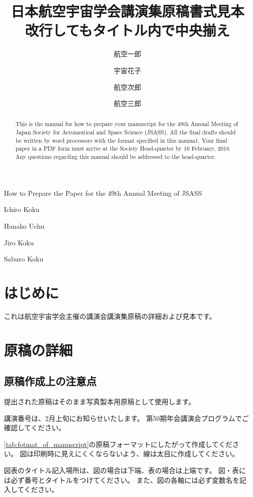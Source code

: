 \documentclass{jsass-nenkai}
\begin{document}
\title{日本航空宇宙学会講演集原稿書式見本\\改行してもタイトル内で中央揃え}{How to Prepare the Paper for the 49th Annual Meeting of JSASS}

\author[1]{航空一郎}{Ichiro Koku}
\author[1]{宇宙花子}{Hanako Uchu}
\author[2]{航空次郎}{Jiro Koku}
\author[1]{航空三郎}{Saburo Koku}



\begin{abstract}
  This is the manual for how to prepare your manuscript for the 49th Annual Meeting of Japan Society for Aeronautical and Space Science (JSASS).
  All the final drafts should be written by word processors with the format specified in this manua1.
  Your final paper in a PDF form must arrive at the Society Head-quarter by 16 February, 2018.
  Any questions regarding this manual should be addressed to the head-quarter.
\end{abstract}

\maketitle


\section{はじめに}
  これは航空宇宙学会主催の講演会講演集原稿の詳細および見本です。

\section{原稿の詳細}
  \subsection{原稿作成上の注意点}
    提出された原稿はそのまま写真製本用原稿として使用します。

    講演番号は、2月上旬にお知らせいたします。
    第50期年会講演会プログラムでご確認してください。

    \cref{tab:fotmat_of_manuscript}の原稿フォーマットにしたがって作成してください。
    図は印刷時に見えにくくならないよう、線は太目に作成してください。

    図表のタイトル記入場所は、図の場合は下端、表の場合は上端です。
    図・表には必ず番号とタイトルをつけてください。
    また、図の各軸には必ず変数名を記入してください。
\end{document}
